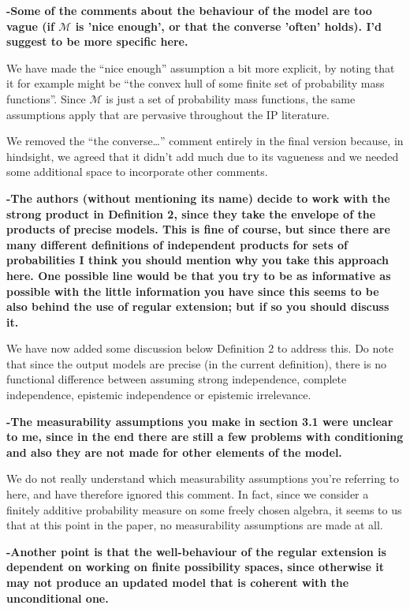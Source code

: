 \documentclass[twoside,11pt]{letter}
\begin{document}
{\bf 
-Some of the comments about the behaviour of the model are too vague (if $\mathcal{M}$ is 'nice enough', or that the converse 'often' holds). I'd suggest to be more specific here. }

We have made the ``nice enough'' assumption a bit more explicit, by noting that it for example might be ``the convex hull of some finite set of probability mass functions''. Since $\mathcal{M}$ is just a set of probability mass functions, the same assumptions apply that are pervasive throughout the IP literature. 

We removed the ``the converse\ldots '' comment entirely in the final version because, in hindsight, we agreed that it didn't add much due to its vagueness and we needed some additional space to incorporate other comments.

{\bf
-The authors (without mentioning its name) decide to work with the strong product in Definition 2, since they take the envelope of the products of precise models. This is fine of course, but since there are many different definitions of independent products for sets of probabilities I think you should mention why you take this approach here. One possible line would be that you try to be as informative as possible with the little information you have since this seems to be also behind the use of regular extension; but if so you should discuss it.
} 

We have now added some discussion below Definition 2 to address this. Do note that since the output models are precise (in the current definition), there is no functional difference between assuming strong independence, complete independence, epistemic independence or epistemic irrelevance.

{\bf
-The measurability assumptions you make in section 3.1 were unclear to me, since in the end there are still a few problems with conditioning and also they are not made for other elements of the model. 
}

We do not really understand which measurability assumptions you're referring to here, and have therefore ignored this comment. In fact, since we consider a finitely additive probability measure on some freely chosen algebra, it seems to us that at this point in the paper, no measurability assumptions are made at all.

{\bf
-Another point is that the well-behaviour of the regular extension is dependent on working on finite possibility spaces, since otherwise it may not produce an updated model that is coherent with the unconditional one. 
}
\end{document}
